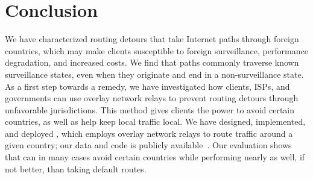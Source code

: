 \section{Conclusion}
\label{conclusion}

We have characterized routing
detours that take Internet paths through foreign countries, which may 
make clients susceptible to foreign surveillance, performance 
degradation, and increased costs.  We find that paths commonly traverse known
surveillance states, even when they originate and end in a
non-surveillance state.  As a first step towards a remedy, we have
investigated how clients, ISPs, and governments can use overlay network relays to prevent routing detours through
unfavorable jurisdictions.  This method gives clients the power to
avoid certain countries, as well as help keep local traffic local.
We have
designed, implemented, and deployed \system{}, which employs overlay network
relays to  route traffic around a given country; our data and code is publicly available~\cite{ransom_data,ran_system}.  Our evaluation
shows  that \system{} can in many cases avoid certain countries while
performing nearly as well, if not better, than taking default routes.

